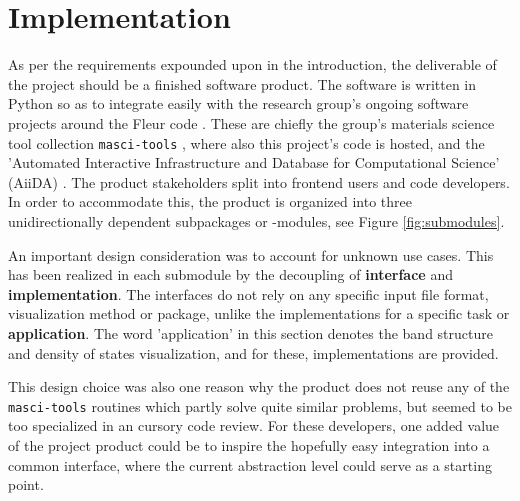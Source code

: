 
\chapter{Implementation}
\label{chap:implementation}


As per the requirements expounded upon in the introduction, the deliverable of
the project should be a finished software product. The software is written in
Python so as to integrate easily with the research group's ongoing software
projects around the Fleur code \cite{fleur}. These are chiefly the group's
materials science tool collection \texttt{masci-tools} \cite{masci-tools} ,
where also this project's code is hosted, and the 'Automated Interactive
Infrastructure and Database for Computational Science' (AiiDA) \cite{aiida}. The
product stakeholders split into frontend users and code developers. In order to
accommodate this, the product is organized into three unidirectionally dependent
subpackages or -modules, see Figure \ref{fig:submodules}.

An important design consideration was to account for unknown use cases. This has
been realized in each submodule by the decoupling of \textbf{interface} and
\textbf{implementation}. The interfaces do not rely on any specific input file
format, visualization method or package, unlike the implementations for a
specific task or \textbf{application}. The word 'application' in this section
denotes the band structure and density of states visualization, and for these,
implementations are provided.

This design choice was also one reason why the product does not reuse any of the
\texttt{masci-tools} routines which partly solve quite similar problems, but
seemed to be too specialized in an cursory code review. For these developers,
one added value of the project product could be to inspire the hopefully easy
integration into a common interface, where the current abstraction level could
serve as a starting point.



